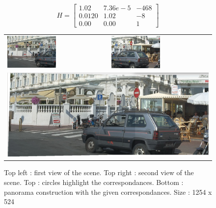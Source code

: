 \documentclass[12pt,a4paper,onecolumn]{article}
\begin{document}
$$ H =
\begin{bmatrix}
1.02 & 7.36e-5 & -468\\
0.0120 & 1.02 & -8\\
0.00 & 0.00 & 1
\end{bmatrix}
$$

\begin{figure}[H]
\begin{center}
\begin{tabular}{p{}  p{}}
\includegraphics[width = 0.5\textwidth]{I1_2.png} &
\includegraphics[width = 0.5\textwidth]{I2_2.png} \\
\multicolumn{2}{c}{\includegraphics[width = 1.0\textwidth]{Panorama_2.png}}
\end{tabular}
\end{center}
\caption{Top left : first view of the scene. Top right : second view of the scene. Top : circles highlight the correspondances. Bottom : panorama construction with the given correspondances. Size : 1254 x 524}
\label{mini_corr}
\end{figure}
\end{document}
